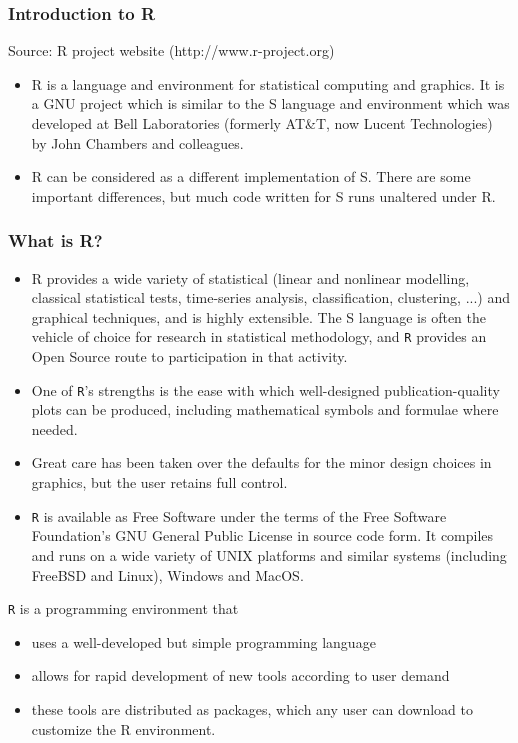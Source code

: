 \documentclass{beamer}
\begin{document}
 	
 	\begin{frame}
 		\frametitle{Introduction to R}
 		Source: R project website (http://www.r-project.org)
 		\begin{itemize}
 			\item R is a language and environment for statistical computing and graphics. It is a GNU project
 			which is similar to the S language and environment which was developed at Bell Laboratories
 			(formerly AT\&T, now Lucent Technologies) by John Chambers and colleagues. 
 			\item R can be considered
 			as a different implementation of S. There are some important differences, but much
 			code written for S runs unaltered under R.
 		\end{itemize}
 		
 	\end{frame}
 	
 	\begin{frame}
 		\frametitle{What is R?}
 		\begin{itemize}
 			\item R provides a wide variety of statistical (linear and nonlinear modelling, classical statistical tests,
 			time-series analysis, classification, clustering, ...) and graphical techniques, and is highly extensible.
 			The S language is often the vehicle of choice for research in statistical methodology,
 			and \texttt{R} provides an Open Source route to participation in that activity.
 			\item One of \texttt{R}’s strengths is the ease with which well-designed publication-quality plots can be
 			produced, including mathematical symbols and formulae where needed. 
 			\item Great care has been
 			taken over the defaults for the minor design choices in graphics, but the user retains full control.
 			\item \texttt{R} is available as Free Software under the terms of the Free Software Foundation’s GNU General
 			Public License in source code form. It compiles and runs on a wide variety of UNIX platforms
 			and similar systems (including FreeBSD and Linux), Windows and MacOS.
 		\end{itemize}
 	\end{frame}
 	\begin{frame}
 		
 		\texttt{R} is a programming environment that
 		\begin{itemize}
 			\item uses a well-developed but simple programming language
 			\item allows for rapid development of new tools according to user demand
 			\item these tools are distributed as packages, which any user can download to customize the R
 			environment.
 		\end{itemize}
 	\end{frame}
 	
\end{document}
